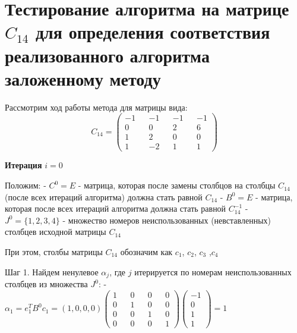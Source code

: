 \documentclass[11pt]{article}
\begin{document}
    \hypertarget{ux442ux435ux441ux442ux438ux440ux43eux432ux430ux43dux438ux435-ux430ux43bux433ux43eux440ux438ux442ux43cux430-ux43dux430-ux43cux430ux442ux440ux438ux446ux435-c_14-ux434ux43bux44f-ux43eux43fux440ux435ux434ux435ux43bux435ux43dux438ux44f-ux441ux43eux43eux442ux432ux435ux442ux441ux442ux432ux438ux44f-ux440ux435ux430ux43bux438ux437ux43eux432ux430ux43dux43dux43eux433ux43e-ux430ux43bux433ux43eux440ux438ux442ux43cux430-ux437ux430ux43bux43eux436ux435ux43dux43dux43eux43cux443-ux43cux435ux442ux43eux434ux443}{%
\section{\texorpdfstring{Тестирование алгоритма на матрице \(C_{14}\)
для определения соответствия реализованного алгоритма заложенному
методу}{Тестирование алгоритма на матрице C\_\{14\} для определения соответствия реализованного алгоритма заложенному методу}}\label{ux442ux435ux441ux442ux438ux440ux43eux432ux430ux43dux438ux435-ux430ux43bux433ux43eux440ux438ux442ux43cux430-ux43dux430-ux43cux430ux442ux440ux438ux446ux435-c_14-ux434ux43bux44f-ux43eux43fux440ux435ux434ux435ux43bux435ux43dux438ux44f-ux441ux43eux43eux442ux432ux435ux442ux441ux442ux432ux438ux44f-ux440ux435ux430ux43bux438ux437ux43eux432ux430ux43dux43dux43eux433ux43e-ux430ux43bux433ux43eux440ux438ux442ux43cux430-ux437ux430ux43bux43eux436ux435ux43dux43dux43eux43cux443-ux43cux435ux442ux43eux434ux443}}

    Рассмотрим ход работы метода для матрицы вида: \[C_{14} = 
\begin{pmatrix} 
-1 && -1 && -1 && -1 \\ 
0 && 0 && 2 && 6 \\ 
1 && 2 && 0 && 0 \\ 
1 && -2 && 1 && 1
\end{pmatrix}
\]

\textbf{Итерация} \(i = 0\)

Положим: - \(C^0 = E\) - матрица, которая после замены столбцов на
столбцы \(C_{14}\) (после всех итераций алгоритма) должна стать равной
\(C_{14}\) - \(B^0 = E\) - матрица, которая после всех итераций
алгоритма должна стать равной \(C_{14}^{-1}\) - \(J^0 = \{1, 2, 3, 4\}\)
- множество номеров неиспользованных (невставленных) столбцев исходной
матрицы \(C_{14}\)

При этом, столбы матрицы \(C_{14}\) обозначим как \(c_1\), \(c_2\),
\(c_3\) ,\(c_4\)

Шаг 1. Найдем ненулевое \(\alpha_j\), где \(j\) итерируется по номерам
неиспользованных столбцев из множества \(J^0\): -
\(\alpha_1 = e_1^TB^0c_1 = (1, 0, 0, 0) \begin{pmatrix} 1 && 0 && 0 && 0 \\ 0 && 1 && 0 && 0 \\ 0 && 0 && 1 && 0 \\ 0 && 0 && 0 && 1 \end{pmatrix} \begin{pmatrix}-1 \\ 0 \\ 1 \\ 1\end{pmatrix} = 1\)
\end{document}
